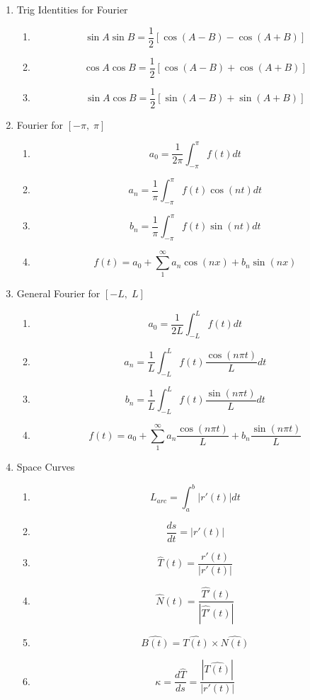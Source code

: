 \documentclass[11pt]{article}
\begin{document}
{\newpage
\begin{enumerate}
    \item Trig Identities for Fourier
    \begin{enumerate}
        \item $$\sin A\sin B=\frac{1}{2}\left[\cos(A-B)-\cos(A+B)\right]$$
        \item $$\cos A\cos B=\frac{1}{2}\left[\cos(A-B)+\cos(A+B)\right]$$
        \item $$\sin A\cos B=\frac{1}{2}\left[\sin(A-B)+\sin(A+B)\right]$$
    \end{enumerate}
    \item Fourier for $[-\pi,\;\pi]$
    \begin{enumerate}
        \item $$a_0=\frac{1}{2\pi}\int_{-\pi}^\pi f(t)dt$$
        \item $$a_n=\frac{1}{\pi}\int_{-\pi}^\pi f(t)\cos(nt)dt$$
        \item $$b_n=\frac{1}{\pi}\int_{-\pi}^\pi f(t)\sin(nt)dt$$
        \item $$f(t)=a_0+\sum_1^\infty a_n\cos(nx)+b_n\sin(nx)$$
    \end{enumerate}
    \item General Fourier for $[-L,\;L]$
    \begin{enumerate}
        \item $$a_0=\frac{1}{2L}\int_{-L}^L f(t)dt$$
        \item $$a_n=\frac{1}{L}\int_{-L}^L f(t)\frac{\cos(n\pi t)}{L}dt$$
        \item $$b_n=\frac{1}{L}\int_{-L}^L f(t)\frac{\sin(n\pi t)}{L}dt$$
        \item $$f(t)=a_0+\sum_1^\infty a_n\frac{\cos(n\pi t)}{L}+b_n\frac{\sin(n\pi t)}{L}$$
    \end{enumerate}
    \item Space Curves
    \begin{enumerate}
        \item 
        $$L_{arc}=\int_a^b|r'(t)|dt$$
        \item 
        $$\frac{ds}{dt}=|r'(t)|$$
        \item 
        $$\hat{T}(t)=\frac{r'(t)}{|r'(t)|}$$
        \item
        $$\hat{N}(t)=\frac{\hat{T'}(t)}{|\hat{T'}(t)|}$$
        \item
        $$\hat{B(t)}=\hat{T(t)}\times\hat{N(t)}$$
        \item
        $$\kappa=\frac{d\hat{T}}{ds}=\frac{|\hat{T(t)}|}{|r'(t)|}$$

\end{enumerate}
\end{enumerate}}
\end{document}
